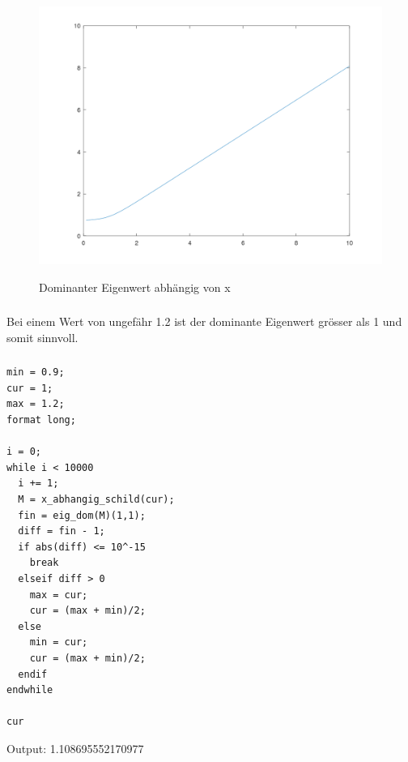 \documentclass{article}
\begin{document}
\begin{figure}[H]
\centering
\includegraphics[scale=0.3]{plot_abh_x.png}
\label{fig:universe}
\caption{Dominanter Eigenwert abhängig von x}
\end{figure}

\subsubsection{}
Bei einem Wert von ungefähr 1.2 ist der dominante Eigenwert grösser als 1 und somit sinnvoll.

\subsubsection{}
\begin{lstlisting}
min = 0.9;
cur = 1;
max = 1.2;
format long;

i = 0;
while i < 10000
  i += 1;
  M = x_abhangig_schild(cur);
  fin = eig_dom(M)(1,1);
  diff = fin - 1;
  if abs(diff) <= 10^-15
    break
  elseif diff > 0
    max = cur;
    cur = (max + min)/2;
  else
    min = cur;
    cur = (max + min)/2;
  endif
endwhile

cur
\end{lstlisting}

Output: 1.108695552170977

\vspace{5mm}

\subsection{}
\end{document}
